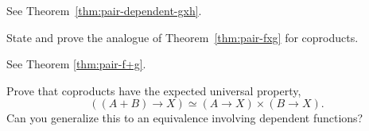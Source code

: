 \begin{solution}
    See Theorem~\ref{thm:pair-dependent-gxh}.
\end{solution}


\begin{exr}
    State and prove the analogue of\/ {\upshape Theorem~\ref{thm:pair-fxg}} for coproducts.
\end{exr}

\begin{solution}
    See Theorem \ref{thm:pair-f+g}.
\end{solution}

\begin{exr}\fe
    Prove that coproducts have the expected universal property, 
    \[
        ((A+B)\to X)\simeq(A\to X)\times(B\to X).
    \]
    Can you generalize this to an equivalence involving dependent functions?
\end{exr}

